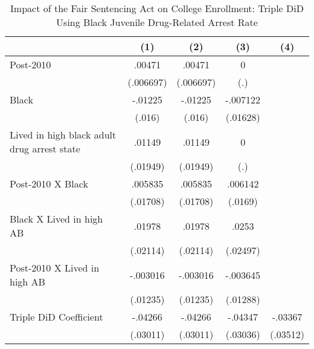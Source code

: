 \begin{table}[htbp]\centering
\def\sym#1{\ifmmode^{#1}\else\(^{#1}\)\fi}
\caption{Impact of the Fair Sentencing Act on College Enrollment: Triple DiD Using Black Juvenile Drug-Related Arrest Rate}
\begin{tabular}{l*{4}{c}}
\hline\hline
                    &\multicolumn{1}{c}{(1)}         &\multicolumn{1}{c}{(2)}         &\multicolumn{1}{c}{(3)}         &\multicolumn{1}{c}{(4)}         \\
\hline
Post-2010           &      .00471         &      .00471         &           0         &                     \\
                    &   (.006697)         &   (.006697)         &         (.)         &                     \\
[1em]
Black               &     -.01225         &     -.01225         &    -.007122         &                     \\
                    &      (.016)         &      (.016)         &    (.01628)         &                     \\
[1em]
Lived in high black adult drug arrest state&      .01149         &      .01149         &           0         &                     \\
                    &    (.01949)         &    (.01949)         &         (.)         &                     \\
[1em]
Post-2010 X Black   &     .005835         &     .005835         &     .006142         &                     \\
                    &    (.01708)         &    (.01708)         &     (.0169)         &                     \\
[1em]
Black X Lived in high AB&      .01978         &      .01978         &       .0253         &                     \\
                    &    (.02114)         &    (.02114)         &    (.02497)         &                     \\
[1em]
Post-2010 X Lived in high AB&    -.003016         &    -.003016         &    -.003645         &                     \\
                    &    (.01235)         &    (.01235)         &    (.01288)         &                     \\
[1em]
Triple DiD Coefficient&     -.04266         &     -.04266         &     -.04347         &     -.03367         \\
                    &    (.03011)         &    (.03011)         &    (.03036)         &    (.03512)         \\

\end{tabular}
\end{table}

